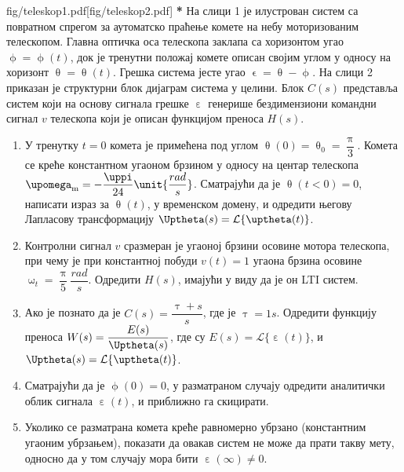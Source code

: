 \begin{slikaDesno}{fig/teleskop1.pdf}[fig/teleskop2.pdf]
\textbf{\color{red}*}\PID
На слици 1 је илустрован систем са повратном спрегом
за аутоматско праћење комете на небу моторизованим телескопом.
Главна оптичка оса телескопа заклапа са 
хоризонтом угао 
$\upphi = \upphi(t)$, док је тренутни положај 
комете описан својим углом у односу на хоризонт 
$\uptheta = \uptheta(t)$. Грешка система јесте 
угао $\upvarepsilon = \uptheta-\upphi$. На слици 
2 приказан је структурни блок дијаграм система 
у целини. Блок $C(s)$ представља систем 
који на основу сигнала грешке $\upepsilon$ 
генерише бездимензиони командни сигнал $v$ телескопа који је описан функцијом 
преноса $H(s)$. 

\begin{enumerate}[label=(\alph*)]
\item У тренутку $t = 0$ комета је примећена
под углом $\uptheta(0) = \uptheta_0 = \dfrac{\uppi}{3}$.
Комета се креће константном угаоном брзином у 
односу на центар телескопа 
${\upomega_{\rm m} = -\dfrac{\uppi}{24} \unit{\dfrac{rad}{s}}}$. \vspace*{1mm} 
Сматрајући да је $\uptheta(t<0) = 0$, 
написати израз за $\uptheta(t)$, у временском домену,
и одредити његову Лапласову трансформацију 
$\Uptheta(s) = \mathcal{L}\{\uptheta(t)\}$.
\end{enumerate}
\end{slikaDesno}

\begin{enumerate}[label=(\alph*)] \setcounter{enumi}{1}
\item Контролни сигнал $v$ сразмеран је
угаоној брзини осовине мотора телескопа, при 
чему је при константној побуди 
$v(t) = 1$ угаона брзина осовине  
$\upomega_t = \dfrac{\uppi}{5} \unit{\dfrac{rad}{s}}$.
Одредити $H(s)$, имајући у 
виду да је он LTI 
систем.

\item Ако је познато да је 
$C(s) = \dfrac{\uptau + s}{s} $, где је 
$\uptau = 1\unit{s}$.\vspace*{1mm}
Одредити функцију преноса 
$W(s) = \dfrac{E(s)}{\Uptheta(s)}$, где су
$E(s) = \mathcal{L}\{\upepsilon(t)\}$, и
$\Uptheta(s) = \mathcal{L}\{\uptheta(t)\}$.


\item
Сматрајући да је $\upphi(0) = 0$, 
у разматраном случају одредити 
аналитички облик сигнала $\upepsilon(t)$, и
приближно га скицирати.
%
\item Уколико се разматрана комета креће 
равномерно убрзано (константним угаоним убрзањем), 
показати да овакав систем не може да прати такву мету,
односно да у том случају мора бити $\upepsilon(\infty) \neq 0$.
\end{enumerate}

